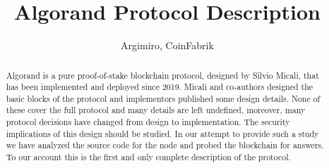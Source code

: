 \documentclass[10pt,a4paper]{article}
\begin{document}
\author{Argimiro, CoinFabrik}
\title{Algorand Protocol Description}

\maketitle
\tableofcontents


\begin{abstract}
    Algorand is a pure proof-of-stake blockchain protocol, designed by Silvio Micali,
    that has been implemented and deployed since 2019. Micali and co-authors designed 
    the basic blocks of the protocol and implementors published some design details.
    None of these cover the full protocol and many details are left undefined, moreover,
    many protocol decisions have changed from design to implementation. The security
    implications of this design should be studied. In our attempt to provide such a 
    study we have analyzed the source code for the node and probed the blockchain for 
    answers. To our account this is the first and only complete description of the 
    protocol. 
\end{abstract}
\end{document}
